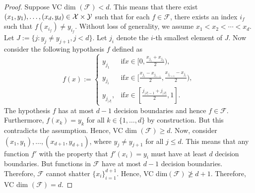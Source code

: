 \begin{proof}
Suppose VC dim $(\mathcal{F}) < d$. 
This means that there exist $(x_1, y_1), \dots, (x_d, y_d) \in \mathcal{X} \times \mathcal{Y}$ such that for each $f \in \mathcal{F}$, there exists an index $i_f$ such that $f(x_{i_f}) \neq y_{i_f}$. Without loss of generality, we assume $x_1 < x_2 <\cdots < x_d$.
Let $J := \{j : y_j \neq y_{j+1}, j < d\}$. Let $j_i$ denote the $i$-th smallest element of $J$.
Now consider the following hypothesis $f$ defined as 
\[
f(x) := 
\begin{cases}
    y_{j_1} &\text{if} x \in [0,\frac{x_{j_1}+x_{j_2}}{2}),\\
    y_{j_{i}} &\text{if} x \in [\frac{x_{j_i} - x_{j_{i-1}}}{2}, \frac{x_{j_{i+1}} - x_{j_i}}{2}),\\    
    y_{j_{|J|}}, & \text{if} x \in [\frac{j_{|J|-1} + j_{|J|}}{2},1].
\end{cases}
\]
The hypothesis $f$ has at most $d-1$ decision boundaries and hence $f \in \mathcal{F}$. Furthermore, $f(x_k) = y_k$ for all $k \in \{1, \dots, d\}$ by construction. But this contradicts the assumption. Hence, VC dim $(\mathcal{F}) \geq d$.
Now, consider $(x_1, y_1), \dots, (x_{d+1}, y_{d+1})$, where  $y_j \neq y_{j+1}$ for all $j \leq d$. This means that any function $f'$ with the property that $f'(x_i) = y_i$ must have at least $d$ decision boundaries. But functions in $\mathcal{F}$ have at most $d-1$ decision boundaries. Therefore, $\mathcal{F}$ cannot shatter $\{x_i\}_{i=1}^{d+1}$. Hence, VC dim$(\mathcal{F}) \not\geq d+1$. Therefore, VC dim $(\mathcal{F}) = d$.

\end{proof}
